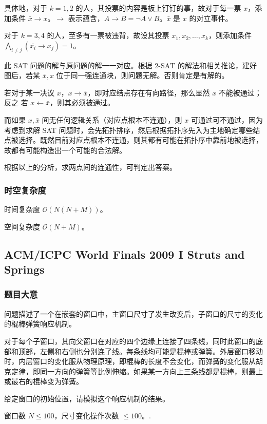 				具体地，对于 $k = 1, 2$ 的人，其投票的内容是板上钉钉的事，故对于每一票 $x$，添加条件 $\bar{x} \rightarrow x$。$\rightarrow$ 表示蕴含，$A \rightarrow B = \neg A \vee B$。$\bar{x}$ 是 ${x}$ 的对立事件。
				
				对于 $k = 3, 4$ 的人，至多有一票被违背，故设其投票 $x_1, x_2, \ldots, x_k$，则添加条件
$\bigwedge_{i \ne j} (\bar{x_i} \rightarrow x_j) = 1$。
				
				此 SAT 问题的解与原问题的解一一对应。根据  $2\text{-SAT}$  的解法和相关推论，建好图后，若某 $\bar{x}, x$ 位于同一强连通块，则问题无解。否则肯定是有解的。
				
				若对于某一决议 $x$，$x \rightarrow \bar{x}$，即对应结点存在有向路径，那么显然 $x$ 不能被通过；反之 若 $x \leftarrow \bar{x}$，则其必须被通过。
				
				而如果 $x, \bar{x}$ 间无任何逻辑关系（对应点根本不连通），则 $x$ 可通过可不通过，因为考虑到求解 SAT 问题时，会先拓扑排序，然后根据拓扑序先入为主地确定哪些结点被选择。既然目前对应点根本不连通，则其都有可能在拓扑序中靠前地被选择，故都有可能构造出一个可能的合法解。
				
				根据以上的分析，求两点间的连通性，可判定出答案。
			\subsubsection{时空复杂度}
				时间复杂度 $\mathcal{O}\left(N(N + M)\right)$。
					
				空间复杂度 $\mathcal{O}\left(N + M\right)$。
		\newpage
		\subsection{ACM/ICPC World Finals 2009 I Struts and Springs}
			\subsubsection{题目大意}
				问题描述了一个在嵌套的窗口中，主窗口尺寸了发生改变后，子窗口的尺寸的变化的棍棒弹簧响应机制。
				
				对于每个子窗口，其向父窗口在对应的四个边缘上连接了四条线，同时此窗口的底部和顶部，左侧和右侧也分别连了线。每条线均可能是棍棒或弹簧。外层窗口移动时，内层窗口的变化服从物理原理，即棍棒的长度不会变化，而弹簧的变化服从胡克定律，即同一方向的弹簧等比例伸缩。如果某一方向上三条线都是棍棒，则最上或最右的棍棒变为弹簧。
				
				给定窗口的初始位置，请模拟这个响应机制的结果。
				
				窗口数 $N \le 100$，尺寸变化操作次数 $\le 100$。.
				
